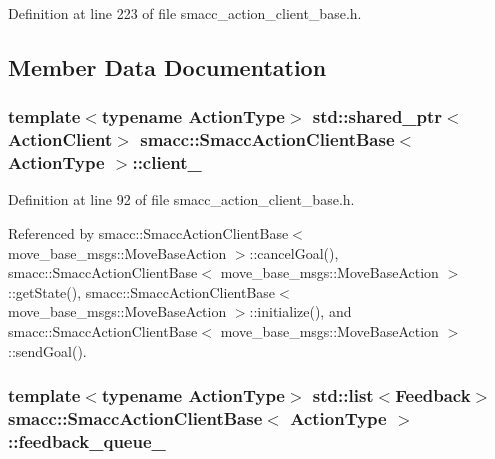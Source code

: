 Definition at line 223 of file smacc\+\_\+action\+\_\+client\+\_\+base.\+h.



\subsection{Member Data Documentation}
\subsubsection[{\texorpdfstring{client\+\_\+}{client_}}]{\setlength{\rightskip}{0pt plus 5cm}template$<$typename Action\+Type$>$ std\+::shared\+\_\+ptr$<${\bf Action\+Client}$>$ {\bf smacc\+::\+Smacc\+Action\+Client\+Base}$<$ Action\+Type $>$\+::client\+\_\+\hspace{0.3cm}{\ttfamily [protected]}}\hypertarget{classsmacc_1_1SmaccActionClientBase_a10d3b707b855c6d360aeeb35e50cd0c7}{}\label{classsmacc_1_1SmaccActionClientBase_a10d3b707b855c6d360aeeb35e50cd0c7}


Definition at line 92 of file smacc\+\_\+action\+\_\+client\+\_\+base.\+h.



Referenced by smacc\+::\+Smacc\+Action\+Client\+Base$<$ move\+\_\+base\+\_\+msgs\+::\+Move\+Base\+Action $>$\+::cancel\+Goal(), smacc\+::\+Smacc\+Action\+Client\+Base$<$ move\+\_\+base\+\_\+msgs\+::\+Move\+Base\+Action $>$\+::get\+State(), smacc\+::\+Smacc\+Action\+Client\+Base$<$ move\+\_\+base\+\_\+msgs\+::\+Move\+Base\+Action $>$\+::initialize(), and smacc\+::\+Smacc\+Action\+Client\+Base$<$ move\+\_\+base\+\_\+msgs\+::\+Move\+Base\+Action $>$\+::send\+Goal().

\subsubsection[{\texorpdfstring{feedback\+\_\+queue\+\_\+}{feedback_queue_}}]{\setlength{\rightskip}{0pt plus 5cm}template$<$typename Action\+Type$>$ std\+::list$<$Feedback$>$ {\bf smacc\+::\+Smacc\+Action\+Client\+Base}$<$ Action\+Type $>$\+::feedback\+\_\+queue\+\_\+\hspace{0.3cm}{\ttfamily [protected]}}\hypertarget{classsmacc_1_1SmaccActionClientBase_a66fe8948b906b832b06b5dae469d8dc4}{}\label{classsmacc_1_1SmaccActionClientBase_a66fe8948b906b832b06b5dae469d8dc4}


